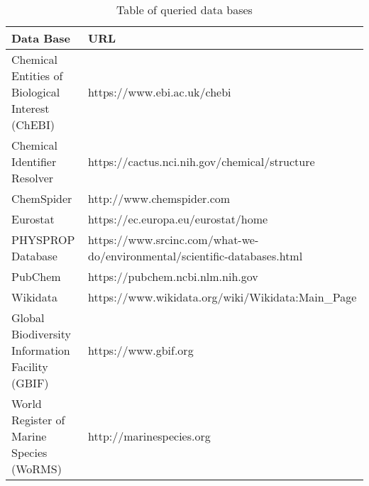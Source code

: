 \begin{table}[ht]
  \caption{Table of queried data bases}
  \label{tab:data-base}
  \centering
\begin{tabular}{ll}
  \hline
  Data Base & URL \\ 
  \hline
  Chemical Entities of Biological Interest (ChEBI) & https://www.ebi.ac.uk/chebi \\ 
  Chemical Identifier Resolver & https://cactus.nci.nih.gov/chemical/structure \\
  ChemSpider & http://www.chemspider.com \\
  Eurostat & https://ec.europa.eu/eurostat/home \\
  PHYSPROP Database & https://www.srcinc.com/what-we-do/environmental/scientific-databases.html \\
  PubChem & https://pubchem.ncbi.nlm.nih.gov \\ 
  Wikidata & https://www.wikidata.org/wiki/Wikidata:Main_Page \\
  Global Biodiversity Information Facility (GBIF) & https://www.gbif.org \\
  World Register of Marine Species (WoRMS) & http://marinespecies.org \\
  \hline
\end{tabular}
\end{table}
